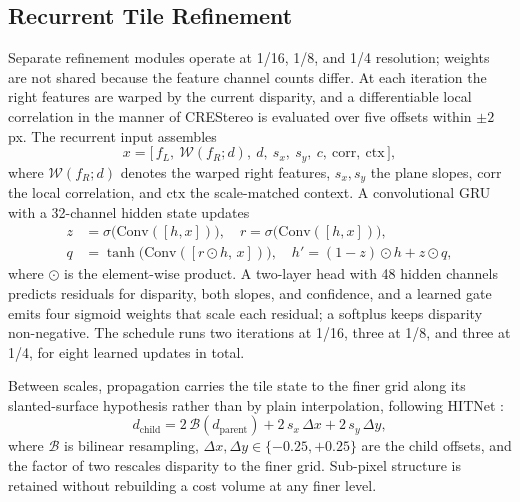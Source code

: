 \documentclass[conference]{IEEEtran}
\begin{document}
\subsection{Recurrent Tile Refinement}
Separate refinement modules operate at 1/16, 1/8, and 1/4 resolution; weights are not shared because the feature channel counts differ. At each iteration the right features are warped by the current disparity, and a differentiable local correlation in the manner of CREStereo \cite{li2022crestereo} is evaluated over five offsets within $\pm 2$ px. The recurrent input assembles
\begin{equation}
x = \bigl[\, f_{L},\ \mathcal{W}(f_{R};d),\ d,\ s_{x},\ s_{y},\
  c,\ \mathrm{corr},\ \mathrm{ctx} \,\bigr],
\label{eq:gruinput}
\end{equation}
where $\mathcal{W}(f_{R};d)$ denotes the warped right features, $s_x, s_y$ the plane slopes, $\mathrm{corr}$ the local correlation, and $\mathrm{ctx}$ the scale-matched context. A convolutional GRU \cite{lipson2021raftstereo} with a 32-channel hidden state updates
\begin{equation}
\begin{aligned}
z &= \sigma\!\bigl(\mathrm{Conv}([h,x])\bigr), \quad
r = \sigma\!\bigl(\mathrm{Conv}([h,x])\bigr),\\
q &= \tanh\!\bigl(\mathrm{Conv}([r \odot h,\,x])\bigr), \quad
h' = (1-z) \odot h + z \odot q,
\end{aligned}
\label{eq:gru}
\end{equation}
where $\odot$ is the element-wise product. A two-layer head with 48 hidden channels predicts residuals for disparity, both slopes, and confidence, and a learned gate emits four sigmoid weights that scale each residual; a softplus keeps disparity non-negative. The schedule runs two iterations at 1/16, three at 1/8, and three at 1/4, for eight learned updates in total.

Between scales, propagation carries the tile state to the finer grid along its slanted-surface hypothesis rather than by plain interpolation, following HITNet \cite{tankovich2021hitnet}:
\begin{equation}
d_{\mathrm{child}} = 2\,\mathcal{B}(d_{\mathrm{parent}})
  + 2\,s_{x}\,\Delta x + 2\,s_{y}\,\Delta y,
\label{eq:prop}
\end{equation}
where $\mathcal{B}$ is bilinear resampling, $\Delta x, \Delta y \in \{-0.25, +0.25\}$ are the child offsets, and the factor of two rescales disparity to the finer grid. Sub-pixel structure is retained without rebuilding a cost volume at any finer level.
\end{document}
